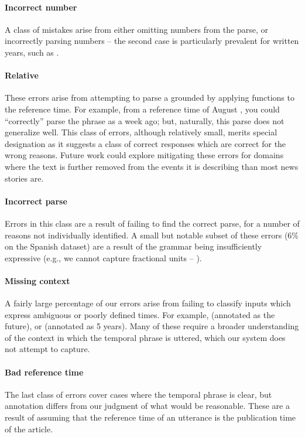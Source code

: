 \paragraph{Incorrect number}
A class of mistakes arise from either omitting numbers from the parse,
  or incorrectly parsing numbers -- the second case is particularly prevalent
  for written years, such as .

\paragraph{Relative }
These errors arise from attempting to parse a grounded  by applying
  functions to the reference time.
For example, from a reference time of August , you could ``correctly''
  parse the phrase  as a week ago; but, naturally, this parse does
  not generalize well.
This class of errors, although relatively small, merits special designation
  as it suggests a class of correct responses which are correct for the wrong
  reasons.
Future work could explore mitigating these errors for domains
  where the text is further removed from the events it is describing
  than most news stories are.

\paragraph{Incorrect parse}
Errors in this class are a result of failing to find the correct parse,
  for a number of reasons not individually identified.
A small but notable subset of these errors ($6\%$ on the Spanish dataset)
  are a result of the grammar
  being insufficiently expressive (e.g., we cannot capture fractional
  units -- ).

\paragraph{Missing context}
A fairly large percentage of our errors arise from failing to classify inputs
  which express ambiguous or poorly defined times.
For example,  (annotated as the future), or 
  (annotated as 5 years).
Many of these require a broader understanding of the context in which the
  temporal phrase is uttered, which our system does not attempt to capture.

\paragraph{Bad reference time}
The last class of errors cover cases where the temporal phrase is clear,
  but annotation differs from our judgment of what would be reasonable.
These are a result of assuming that the reference time of an utterance is
  the publication time of the article.
